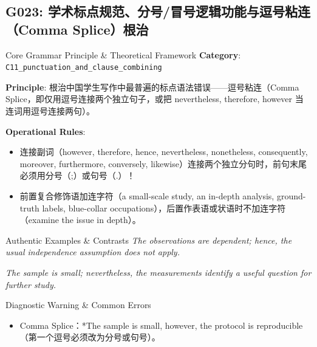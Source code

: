 \subsection{G023: 学术标点规范、分号/冒号逻辑功能与逗号粘连（Comma Splice）根治}\label{sec:rule:G023}
\begin{ConceptBox}{Core Grammar Principle \& Theoretical Framework}
\textbf{Category}: \texttt{C11\_punctuation\_and\_clause\_combining}\par\vspace{3pt}
\textbf{Principle}: 根治中国学生写作中最普遍的标点语法错误------逗号粘连（Comma Splice，即仅用逗号连接两个独立句子，或把 nevertheless, therefore, however 当连词用逗号连接两句）。\par\vspace{4pt}
\textbf{Operational Rules}:
\begin{itemize}[leftmargin=1.5em, itemsep=1pt]
  \item 连接副词（however, therefore, hence, nevertheless, nonetheless, consequently, moreover, furthermore, conversely, likewise）连接两个独立分句时，前句末尾必须用分号（;）或句号（.）！
  \item 前置复合修饰语加连字符（a small-scale study, an in-depth analysis, ground-truth labels, blue-collar occupations），后置作表语或状语时不加连字符（examine the issue in depth）。
\end{itemize}
\end{ConceptBox}
\begin{ExampleBox}{Authentic Examples \& Contrasts}
\textit{The observations are dependent; hence, the usual independence assumption does not apply.}\par\vspace{2pt}
\textit{The sample is small; nevertheless, the measurements identify a useful question for further study.}\par\vspace{2pt}
\end{ExampleBox}
\begin{TipBox}{Diagnostic Warning \& Common Errors}
\begin{itemize}[leftmargin=1.5em, itemsep=1pt]
  \item Comma Splice：*The sample is small, however, the protocol is reproducible（第一个逗号必须改为分号或句号）。
\end{itemize}
\end{TipBox}
\vspace{6pt}
